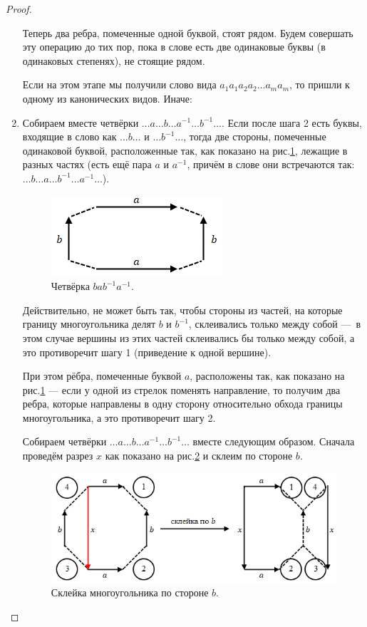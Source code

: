 \begin{proof}
\begin{enumerate}
        Теперь два ребра, помеченные одной буквой, стоят рядом. Будем совершать эту операцию до тих пор, пока в слове есть две одинаковые буквы (в одинаковых степенях), не стоящие рядом.

        Если на этом этапе мы получили слово вида $a_1 a_1 a_2 a_2 \dots a_m a_m$, то пришли к одному из канонических видов. Иначе:

        \item Собираем вместе четвёрки $\dots a \dots b \dots a^{-1} \dots b^{-1} \dots$.
        Если после шага 2 есть буквы, входящие в слово как $\dots b \dots$ и $\dots b^{-1} \dots$, тогда две стороны, помеченные одинаковой буквой, расположенные так, как показано на рис.\ref{fig:c10.7}, лежащие в разных частях (есть ещё пара $a$ и $a^{-1}$, причём в слове они встречаются так: $\dots b \dots a \dots b^{-1} \dots a^{-1} \dots$).

        \begin{figure}[ht]
            \centering
            \includegraphics[scale=0.7]{images/c10.7.png}
            \caption{Четвёрка $b a b^{-1} a^{-1}$.}
            \label{fig:c10.7}
        \end{figure}

        Действительно, не может быть так, чтобы стороны из частей, на которые границу многоугольника делят $b$ и $b^{-1}$, склеивались только между собой — в этом случае вершины из этих частей склеивались бы только между собой, а это противоречит шагу 1 (приведение к одной вершине).

        При этом рёбра, помеченные буквой $a$, расположены так, как показано на рис.\ref{fig:c10.7} — если у одной из стрелок поменять направление, то получим два ребра, которые направлены в одну сторону относительно обхода границы многоугольника, а это противоречит шагу 2.

        Собираем четвёрки $\dots a \dots b \dots a^{-1} \dots b^{-1} \dots$ вместе следующим образом. Сначала проведём разрез $x$ как показано на рис.\ref{fig:c10.8} и склеим по стороне $b$.

        \begin{figure}[ht]
            \centering
            \includegraphics[scale=0.7]{images/c10.8.png}
            \caption{Склейка многоугольника по стороне $b$.}
            \label{fig:c10.8}
        \end{figure}


\end{enumerate}
\end{proof}

